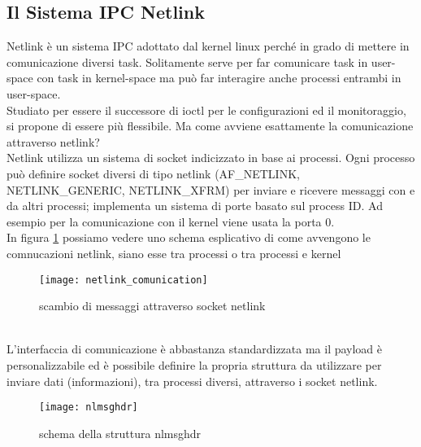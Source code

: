 \subsection{Il Sistema IPC Netlink}
Netlink \`e un sistema IPC adottato dal kernel linux perch\'e in grado di mettere in comunicazione diversi task. Solitamente serve per far comunicare task in user-space con task in kernel-space ma pu\`o far interagire anche processi entrambi in user-space.\\
Studiato per essere il successore di ioctl per le configurazioni ed il monitoraggio, si propone di essere pi\`u flessibile.
Ma come avviene esattamente la comunicazione attraverso netlink?\\
Netlink utilizza un sistema di socket indicizzato in base ai processi. Ogni processo pu\`o definire socket diversi di tipo netlink (AF\_NETLINK, NETLINK\_GENERIC, NETLINK\_XFRM) per inviare e ricevere messaggi con e da altri processi; implementa un sistema di porte basato sul process ID. Ad esempio per la comunicazione con il kernel viene usata la porta 0.\\
In figura \ref{fig:netcom} possiamo vedere uno schema esplicativo di come avvengono le comnucazioni netlink, siano esse tra processi o tra processi e kernel
\begin{figure}[h]                       %
\begin{center}                          %
\texttt{[image: netlink\_comunication]}%
%
\caption[comunicazione netlink]{scambio di messaggi attraverso socket netlink}\label{fig:netcom}
\end{center}
\end{figure}\\
L'interfaccia di comunicazione \`e abbastanza standardizzata ma il payload \`e personalizzabile ed \`e possibile definire la propria struttura da utilizzare per inviare dati (informazioni), tra processi diversi, attraverso i socket netlink.
\begin{figure}[h]                       %
\begin{center}                          %
\texttt{[image: nlmsghdr]}%
%
\caption[struct nlmsghdr]{schema della struttura nlmsghdr}
\end{center}
\end{figure}\\
